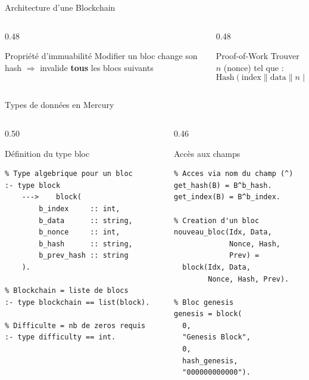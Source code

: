 \documentclass[aspectratio=169,12pt]{beamer}
\begin{document}
\begin{frame}{\faLink\quad Architecture d'une Blockchain}
  \vspace{0.2em}
  \begin{columns}[T]
    \begin{column}{0.48\textwidth}
      \begin{block}{Propriété d'immuabilité}
        Modifier un bloc change son hash
        $\Rightarrow$ invalide \textbf{tous} les blocs suivants
      \end{block}
    \end{column}
    \begin{column}{0.48\textwidth}
      \begin{exampleblock}{Proof-of-Work}
        Trouver $n$ (nonce) tel que :
        $$\text{Hash}(\text{index}\|\text{data}\|n\|\text{prev}) \prec \text{cible}$$
      \end{exampleblock}
    \end{column}
  \end{columns}
\end{frame}

\begin{frame}[fragile]{\faCode\quad Types de données en Mercury}
  \begin{columns}[T]
    \begin{column}{0.50\textwidth}
      \begin{exampleblock}{Définition du type bloc}
\begin{lstlisting}
% Type algebrique pour un bloc
:- type block
    --->    block(
        b_index     :: int,
        b_data      :: string,
        b_nonce     :: int,
        b_hash      :: string,
        b_prev_hash :: string
    ).

% Blockchain = liste de blocs
:- type blockchain == list(block).

% Difficulte = nb de zeros requis
:- type difficulty == int.
\end{lstlisting}
      \end{exampleblock}
    \end{column}
    \begin{column}{0.46\textwidth}
      \begin{exampleblock}{Accès aux champs}
\begin{lstlisting}
% Acces via nom du champ (^)
get_hash(B) = B^b_hash.
get_index(B) = B^b_index.

% Creation d'un bloc
nouveau_bloc(Idx, Data,
             Nonce, Hash,
             Prev) =
  block(Idx, Data,
        Nonce, Hash, Prev).

% Bloc genesis
genesis = block(
  0,
  "Genesis Block",
  0,
  hash_genesis,
  "000000000000").
\end{lstlisting}
      \end{exampleblock}
    \end{column}
  \end{columns}
\end{frame}
\end{document}
